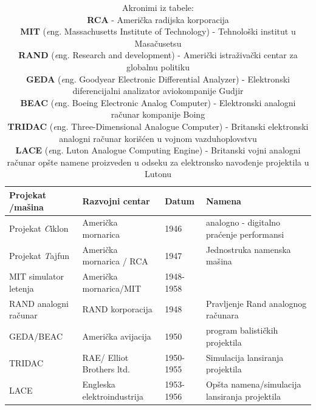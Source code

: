 \documentclass[a4paper]{article}
\begin{document}
{		\begin{table}[h!]
			\begin{center}
				\begin{tabular}{| m{2cm} | m{4cm} | m{1cm} | m{4cm} |}
					\hline
					Projekat /mašina & Razvojni centar & Datum & Namena \\
					\hline
					Projekat \emph Ciklon & Američka mornarica & 1946 & analogno - digitalno praćenje performansi \\
					\hline
					Projekat \emph Tajfun & Američka mornarica / RCA & 1947 & Jednostruka namenska mašina \\
					\hline
					MIT simulator letenja & Američka mornarica/MIT & 1948- 1958 & \\
					\hline
					RAND analogni računar & RAND korporacija & 1948 & Pravljenje Rand analognog računara \\
					\hline
					GEDA/BEAC &  Američka avijacija & 1950 & program balističkih projektila \\
					\hline
					TRIDAC & RAE/ Elliot Brothers ltd. & 1950- 1955 & Simulacija lansiranja projektila \\
					\hline
					LACE & Engleska elektroindustrija & 1953- 1956 & Opšta namena/simulacija lansiranja projektila \\ 
					\hline
				\end{tabular}
				\label{tab:tableEAR}
				\caption{
						Akronimi iz tabele: \\
						\textbf{RCA} - Američka radijska korporacija \\
						\textbf{MIT} (\textit eng. Massachusetts Institute of Technology) - Tehnološki institut u Masačusetsu  \\
						\textbf{RAND} (\textit eng. Research and development) - Američki istraživački centar za globalnu politiku \\
						\textbf{GEDA} (\textit eng. Goodyear Electronic Differential Analyzer) - Elektronski diferencijalni analizator aviokompanije Gudjir \\
						\textbf{BEAC} (\textit eng. Boeing Electronic Analog Computer) - Elektronski analogni računar kompanije Boing \\
						\textbf{TRIDAC} (\textit eng. Three-Dimensional Analogue Computer) - Britanski elektronski analogni računar korišćen u vojnom vazduhoplovstvu \\
						\textbf{LACE} (\textit eng. Luton Analogue Computing Engine) - Britanski vojni analogni računar opšte namene proizveden u odseku za elektronsko navođenje projektila u Lutonu 
						}
			\end{center}
		\end{table}

}
\end{document}
